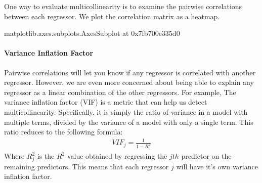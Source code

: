 \documentclass[letterpaper,10pt,english]{sphinxmanual}
\begin{document}

One way to evaluate multicollinearity is to examine the pairwise correlations between each regressor. We plot the correlation matrix as a heatmap.

\begin{sphinxVerbatim}[commandchars=\\\{\}]
   
\end{sphinxVerbatim}

\begin{sphinxVerbatim}[commandchars=\\\{\}]
\PYGZlt{}matplotlib.axes.\PYGZus{}subplots.AxesSubplot at 0x7fb700e335d0\PYGZgt{}
\end{sphinxVerbatim}

\noindent{}


\paragraph{Variance Inflation Factor}
\label{\detokenize{content/GLM_Single_Subject_Model:variance-inflation-factor}}
Pairwise correlations will let you know if any regressor is correlated with another regressor. However, we are even more concerned about being able to explain any regressor as a linear combination of the other regressors. For example,  The variance inflation factor (VIF) is a metric that can help us detect multicollinearity. Specifically, it is simply the ratio of variance in a model with multiple terms, divided by the variance of a model with only a single term. This ratio reduces to the following formula:
\begin{equation*}
\begin{split}VIF_j=\frac{1}{1-R_i^2}\end{split}
\end{equation*}
Where \(R_j^2\) is the \(R^2\) value obtained by regressing the \(jth\) predictor on the remaining predictors. This means that each regressor \(j\) will have it’s own variance inflation factor.
\end{document}
